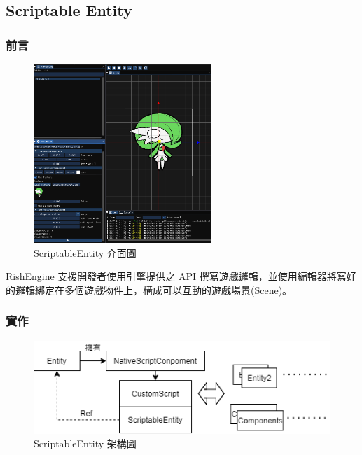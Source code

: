 \subsection{Scriptable Entity}
\label{sub:Scriptable Entity}

\subsubsection{前言}

\begin{figure}[h]
    \begin{center}
    \includegraphics[width=0.6\textwidth]{./resources/scriptable/view_a.png}
    \end{center}
\caption{ScriptableEntity 介面圖}
\label{fig:implement}
\end{figure}

RishEngine 支援開發者使用引擎提供之 API 撰寫遊戲邏輯，並使用編輯器將寫好的邏輯綁定在多個遊戲物件上，構成可以互動的遊戲場景(Scene)。

\subsubsection{實作}

\begin{figure}[h]
    \begin{center}
    \includegraphics[width=\textwidth]{./resources/scriptable/implement.png}
    \end{center}
\caption{ScriptableEntity 架構圖}
\label{fig:implement}
\end{figure}

